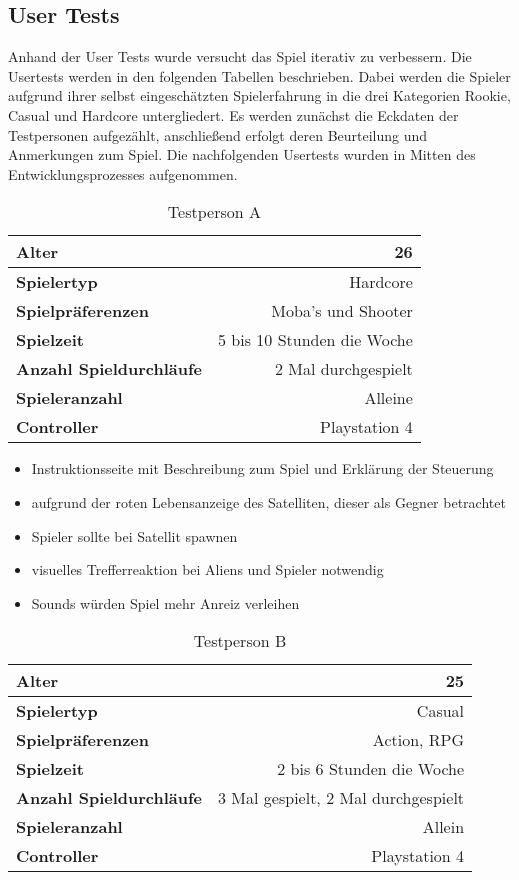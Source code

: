 \documentclass[11pt]{scrartcl}
\begin{document}
\subsection{User Tests}
\label{subsec:user-tests}

Anhand der User Tests wurde versucht das Spiel iterativ zu verbessern. Die Usertests werden in den folgenden Tabellen beschrieben. Dabei werden die Spieler aufgrund ihrer selbst eingeschätzten Spielerfahrung in die drei Kategorien Rookie, Casual und Hardcore untergliedert. Es werden zunächst die Eckdaten der Testpersonen aufgezählt, anschließend erfolgt deren Beurteilung und Anmerkungen zum Spiel. Die nachfolgenden Usertests wurden in Mitten des Entwicklungsprozesses aufgenommen. 

\begin{table}[htp]
\centering
\begin{tabular}{|l|r|}
\hline
\textbf{Alter} &26\\
\hline
\textbf{Spielertyp} &Hardcore\\
\hline
\textbf{Spielpräferenzen} &Moba's und Shooter\\
\hline
\textbf{Spielzeit} &5 bis 10 Stunden die Woche\\
\hline
\textbf{Anzahl Spieldurchläufe} &2 Mal durchgespielt\\
\hline
\textbf{Spieleranzahl} &Alleine\\
\hline
\textbf{Controller} &Playstation 4\\
\hline
\end{tabular}
\caption{Testperson A}
\label{tab:test-a}
\end{table}

\vspace{-6mm}
\begin{itemize}
\setlength{\parskip}{0pt}
\item Instruktionsseite mit Beschreibung zum Spiel und Erklärung der Steuerung
\item aufgrund der roten Lebensanzeige des Satelliten, dieser als Gegner betrachtet
\item Spieler sollte bei Satellit spawnen
\item visuelles Trefferreaktion bei Aliens und Spieler notwendig
\item Sounds würden Spiel mehr Anreiz verleihen
\end{itemize}

\begin{table}[htp]
\centering
\begin{tabular}{|l|r|}
\hline
\textbf{Alter} &25\\
\hline
\textbf{Spielertyp} &Casual\\
\hline
\textbf{Spielpräferenzen} &Action, RPG\\
\hline
\textbf{Spielzeit} &2 bis 6 Stunden die Woche\\
\hline
\textbf{Anzahl Spieldurchläufe} &3 Mal gespielt, 2 Mal durchgespielt\\
\hline
\textbf{Spieleranzahl} &Allein\\
\hline
\textbf{Controller} &Playstation 4\\
\hline
\end{tabular}
\caption{Testperson B}
\label{tab:test-b}
\end{table}
\end{document}
